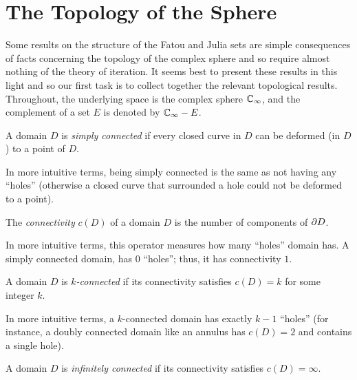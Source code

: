 \section{The Topology of the Sphere}
\label{sec:the_topology_of_the_sphere}

Some results on the structure of the Fatou and Julia sets are simple
consequences of facts concerning the topology of the complex sphere and so
require almost nothing of the theory of iteration. It seems best to present
these results in this light and so our first task is to collect together the
relevant topological results. Throughout, the underlying space is the complex
sphere $\mathbb{C}_\infty$, and the complement of a set $E$ is denoted by $\mathbb{C}_\infty - E$.

\begin{definition}
    A domain $D$ is \emph{simply connected} if every closed curve in $D$ can be
    deformed (in $D$) to a point of $D$.
\end{definition}

In more intuitive terms, being simply connected is the same as not having any
\enquote{holes} (otherwise a closed curve that surrounded a hole could not be
deformed to a point).

\begin{definition}
    The \emph{connectivity} $c(D)$ of a domain $D$ is the number of components
    of $\partial {D}$.
\end{definition}

In more intuitive terms, this operator measures how many \enquote{holes} domain
has. A simply connected domain, has $0$ \enquote{holes}; thus, it has
connectivity $1$.

\begin{definition}
    A domain $D$ is \emph{$k$-connected} if its connectivity satisfies $c(D) =
    k$ for some integer $k$.
\end{definition}

In more intuitive terms, a $k$-connected domain has exactly $k-1$
\enquote{holes} (for instance, a doubly connected domain like an annulus has
$c(D) = 2$ and contains a single hole).

\begin{definition}
    A domain $D$ is \emph{infinitely connected} if its connectivity satisfies
    $c(D) = \infty$.
\end{definition}

